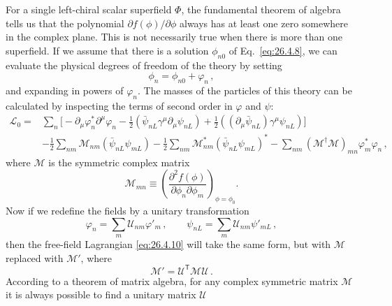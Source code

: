 For a single left-chiral scalar superfield \(\Phi\), the fundamental theorem
of algebra tells us that the polynomial \(\partial f(\phi)/\partial\phi\)
always has at least one zero somewhere in the complex plane. This is not
necessarily true when there is more than one superfield. If we assume that
there is a solution \(\phi_{n0}\) of Eq.~\eqref{eq:26.4.8}, we can evaluate the
physical degrees of freedom of the theory by setting
\begin{equation}
  \phi_n=\phi_{n0}+\varphi_n\,,
  \tag{26.4.9}\label{eq:26.4.9}
\end{equation}
and expanding in powers of \(\varphi_n\). The masses of the particles of this
theory can be calculated by inspecting the terms of second order in
\(\varphi\) and \(\psi\):
\begin{equation}
  \begin{aligned}
  \mathcal{L}_0={}&
  \sum_n\biggl[
    -\partial_\mu\varphi_n^*\partial^\mu\varphi_n
    -\frac12(\bar\psi_{nL}\gamma^\mu\partial_\mu\psi_{nL})
    +\frac12((\partial_\mu\bar\psi_{nL})\gamma^\mu\psi_{nL})
  \biggr]
  \\
  &-\frac12\sum_{nm}\mathcal{M}_{nm}(\bar\psi_{nL}\psi_{mL})
  -\frac12\sum_{nm}\mathcal{M}_{nm}^*
    (\bar\psi_{nL}\psi_{mL})^*
  -\sum_{nm}(\mathcal{M}^\dagger\mathcal{M})_{mn}
    \varphi_m^*\varphi_n\,,
  \end{aligned}
  \tag{26.4.10}\label{eq:26.4.10}
\end{equation}
where \(\mathcal{M}\) is the symmetric complex matrix
\begin{equation}
  \mathcal{M}_{mn}\equiv
  \left(
    \frac{\partial^2f(\phi)}{\partial\phi_n\partial\phi_m}
  \right)_{\phi=\phi_0}.
  \tag{26.4.11}\label{eq:26.4.11}
\end{equation}
Now if we redefine the fields by a unitary transformation
\begin{equation}
  \varphi_n=\sum_m\mathcal{U}_{nm}\varphi'_m\,,
  \qquad
  \psi_{nL}=\sum_m\mathcal{U}_{nm}\psi'_{mL}\,,
  \tag{26.4.12}\label{eq:26.4.12}
\end{equation}
then the free-field Lagrangian \eqref{eq:26.4.10} will take the same form, but
with \(\mathcal{M}\) replaced with \(\mathcal{M}'\), where
\begin{equation}
  \mathcal{M}'=\mathcal{U}^{\mathsf T}\mathcal{M}\mathcal{U}\,.
  \tag{26.4.13}\label{eq:26.4.13}
\end{equation}
According to a theorem of matrix algebra, for any complex symmetric matrix
\(\mathcal{M}\) it is always possible to find a unitary matrix \(\mathcal{U}\)
